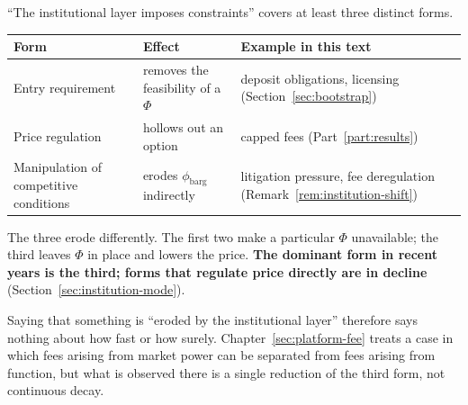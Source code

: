 \begin{remark}
\label{rem:institution-modes}
``The institutional layer imposes constraints'' covers at least three distinct forms.

\begin{center}
\begin{tabularx}{\textwidth}{@{}P{0.26\textwidth}XP{0.28\textwidth}@{}}
\toprule
Form & Effect & Example in this text \\
\midrule
Entry requirement & removes the feasibility of a $\Phi$ & deposit obligations, licensing (Section~\ref{sec:bootstrap}) \\
Price regulation & hollows out an option & capped fees (Part~\ref{part:results}) \\
Manipulation of competitive conditions & erodes $\phi_{\mathrm{barg}}$ indirectly & litigation pressure, fee deregulation (Remark~\ref{rem:institution-shift}) \\
\bottomrule
\end{tabularx}
\label{tab:institution-modes}
\end{center}

The three erode differently. The first two make a particular $\Phi$ unavailable; the third
leaves $\Phi$ in place and lowers the price.
\textbf{The dominant form in recent years is the third; forms that regulate price directly
are in decline} (Section~\ref{sec:institution-mode}).

Saying that something is ``eroded by the institutional layer'' therefore says nothing about
how fast or how surely. Chapter~\ref{sec:platform-fee} treats a case in which fees arising
from market power can be separated from fees arising from function, but what is observed
there is a single reduction of the third form, not continuous decay.
\end{remark}

